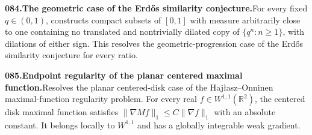 \documentclass[11pt,a4paper]{article}
\begin{document}
  \par \begin{minipage}{\linewidth}
  \fontsize{10.5}{12.6}\selectfont\RaggedRight
  \hypertarget{result 084}{}
  {\bfseries\textcolor{muted}{084.}\enspace The geometric case of the Erd\H{o}s similarity conjecture.}\enspace For every fixed $q\in(0,1)$, constructs compact subsets of $[0,1]$ with measure arbitrarily close to one containing no translated and nontrivially dilated copy of $\{q^n:n\ge1\}$, with dilations of either sign. This resolves the geometric-progression case of the Erd\H{o}s similarity conjecture for every ratio.\par
  \end{minipage}\par\vspace{5pt}



  \par \begin{minipage}{\linewidth}
  \fontsize{10.5}{12.6}\selectfont\RaggedRight
  \hypertarget{result 085}{}
  {\bfseries\textcolor{muted}{085.}\enspace Endpoint regularity of the planar centered maximal function.}\enspace Resolves the planar centered-disk case of the Haj{\l}asz--Onninen maximal-function regularity problem. For every real $f\in W^{1,1}(\mathbb R^2)$, the centered disk maximal function satisfies $\|\nabla Mf\|_1\le C\|\nabla f\|_1$ with an absolute constant. It belongs locally to $W^{1,1}$ and has a globally integrable weak gradient.\par
  \end{minipage}\par\vspace{5pt}
\end{document}
